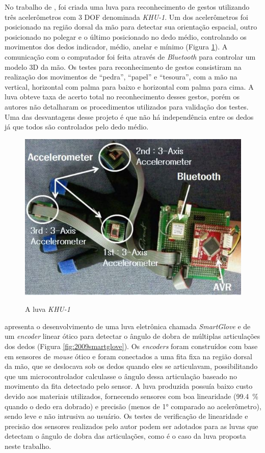 No trabalho de , foi criada uma luva para reconhecimento de gestos utilizando três acelerômetros com 3 \ac{DOF} denominada \textit{KHU-1}. Um dos acelerômetros foi posicionado na região dorsal da mão para detectar sua orientação espacial, outro posicionado no polegar e o último posicionado no dedo médio, controlando os movimentos dos dedos indicador, médio, anelar e mínimo (Figura \ref{fig:2009accel}). A comunicação com o computador foi feita através de \textit{Bluetooth} para controlar um modelo \ac{3D} da mão. Os testes para reconhecimento de gestos consistiram na realização dos movimentos de ``pedra'', ``papel'' e ``tesoura'', com a mão na vertical, horizontal com palma para baixo e horizontal com palma para cima. A luva obteve taxa de acerto total no reconhecimento desses gestos, porém os autores não detalharam os procedimentos utilizados para validação dos testes. Uma das desvantagens desse projeto é que não há independência entre os dedos já que todos são controlados pelo dedo médio.

\begin{figure}[H]
  \setlength{\abovecaptionskip}{0pt}
  \setlength{\belowcaptionskip}{0pt}
  \caption[A luva \textit{KHU-1}]{A luva \textit{KHU-1}}
  \centering
  \includegraphics[width=.5\textwidth]{imagem/2009accel}
  \captionsetup{justification=centering}
  \label{fig:2009accel}
\end{figure}

 apresenta o desenvolvimento de uma luva eletrônica chamada \textit{SmartGlove} e de um \textit{encoder} linear ótico para detectar o ângulo de dobra de múltiplas articulações dos dedos (Figura \ref{fig:2009smartglove}). Os \textit{encoders} foram construídos com base em sensores de \textit{mouse} ótico e foram conectados a uma fita fixa na região dorsal da mão, que se deslocava sob os dedos quando eles se articulavam, possibilitando que um microcontrolador calculasse o ângulo dessa articulação baseado no movimento da fita detectado pelo sensor. A luva produzida possuía baixo custo devido aos materiais utilizados, fornecendo sensores com boa linearidade (\SI{99.4}{\percent} quando o dedo era dobrado) e precisão (menos de \ang{1} comparado ao acelerômetro), sendo leve e não intrusiva ao usuário. Os testes de verificação de linearidade e precisão dos sensores realizados pelo autor podem ser adotados para as luvas que detectam o ângulo de dobra das articulações, como é o caso da luva proposta neste trabalho.

